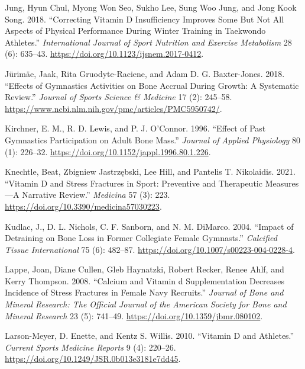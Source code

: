 \documentclass[
]{article}
\newlength{\cslhangindent}
\newenvironment{CSLReferences}[2] %
 {\begin{list}{}{%
  \setlength{\itemindent}{0pt}
  \setlength{\leftmargin}{0pt}
  \setlength{\parsep}{0pt}
  \ifodd #1
   \setlength{\leftmargin}{\cslhangindent}
   \setlength{\itemindent}{-1\cslhangindent}
  \fi
  \setlength{\itemsep}{#2\baselineskip}}}
 {\end{list}}
\begin{document}
\begin{CSLReferences}{1}{0}
Jung, Hyun Chul, Myong Won Seo, Sukho Lee, Sung Woo Jung, and Jong Kook Song. 2018. {``Correcting {Vitamin} {D} {Insufficiency} {Improves} {Some} {But} {Not} {All} {Aspects} of {Physical} {Performance} {During} {Winter} {Training} in {Taekwondo} {Athletes}.''} \emph{International Journal of Sport Nutrition and Exercise Metabolism} 28 (6): 635--43. \url{https://doi.org/10.1123/ijsnem.2017-0412}.

Jürimäe, Jaak, Rita Gruodyte-Raciene, and Adam D. G. Baxter-Jones. 2018. {``Effects of {Gymnastics} {Activities} on {Bone} {Accrual} During {Growth}: {A} {Systematic} {Review}.''} \emph{Journal of Sports Science \& Medicine} 17 (2): 245--58. \url{https://www.ncbi.nlm.nih.gov/pmc/articles/PMC5950742/}.

Kirchner, E. M., R. D. Lewis, and P. J. O'Connor. 1996. {``Effect of Past Gymnastics Participation on Adult Bone Mass.''} \emph{Journal of Applied Physiology} 80 (1): 226--32. \url{https://doi.org/10.1152/jappl.1996.80.1.226}.

Knechtle, Beat, Zbigniew Jastrzębski, Lee Hill, and Pantelis T. Nikolaidis. 2021. {``Vitamin {D} and {Stress} {Fractures} in {Sport}: {Preventive} and {Therapeutic} {Measures}---{A} {Narrative} {Review}.''} \emph{Medicina} 57 (3): 223. \url{https://doi.org/10.3390/medicina57030223}.

Kudlac, J., D. L. Nichols, C. F. Sanborn, and N. M. DiMarco. 2004. {``Impact of Detraining on Bone Loss in Former Collegiate Female Gymnasts.''} \emph{Calcified Tissue International} 75 (6): 482--87. \url{https://doi.org/10.1007/s00223-004-0228-4}.

Lappe, Joan, Diane Cullen, Gleb Haynatzki, Robert Recker, Renee Ahlf, and Kerry Thompson. 2008. {``Calcium and Vitamin d Supplementation Decreases Incidence of Stress Fractures in Female Navy Recruits.''} \emph{Journal of Bone and Mineral Research: The Official Journal of the American Society for Bone and Mineral Research} 23 (5): 741--49. \url{https://doi.org/10.1359/jbmr.080102}.

Larson-Meyer, D. Enette, and Kentz S. Willis. 2010. {``Vitamin {D} and Athletes.''} \emph{Current Sports Medicine Reports} 9 (4): 220--26. \url{https://doi.org/10.1249/JSR.0b013e3181e7dd45}.


\end{CSLReferences}
\end{document}
